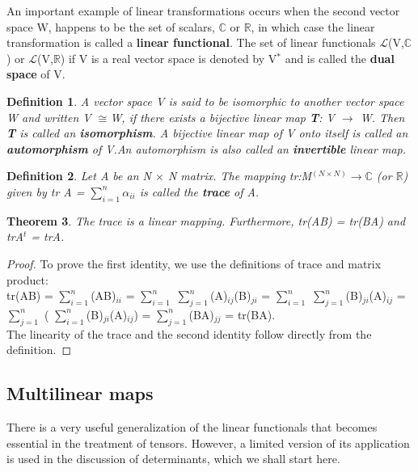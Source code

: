\documentclass[12pt,a4paper]{article}
\newtheorem{thm}{Theorem}
\newtheorem{defn}[thm]{Definition}
\begin{document}
An important example of linear transformations occurs when the second vector space W, happens to be the set of scalars, $\mathbb{C}$ or $\mathbb{R}$, in which case the linear transformation is called a \textbf{linear functional}. The set of linear functionals $\mathcal{L}$(V,$\mathbb{C}$) or $\mathcal{L}$(V,$\mathbb{R}$) if V is a real vector space is denoted by V$^*$ and is called the \textbf{dual space} of V.
\begin{defn}
A vector space V is said to be isomorphic to another vector space W and written V ${\cong}$W, if there exists a bijective linear map \textbf{T}:
V $\to$ W. Then \textbf{T} is called an \textbf{isomorphism}. A bijective linear map of V onto itself is called an \textbf{automorphism} of V.An automorphism is also called an \textbf{invertible} linear map. 
\end{defn}
\begin{defn}
Let A be an N $\times$ N matrix. The mapping tr:M$^{(N\times N)}$$\to$$\mathbb{C}$ (or $\mathbb{R}$) given by tr A = $\sum_{i=1}^{n}$$ \alpha_{ii} $ is called the \textbf{trace} of A.
\end{defn}
\begin{thm}
The trace is a linear mapping. Furthermore, tr(AB) = tr(BA) and trA$^t$ = trA.
\end{thm}
\begin{proof}
To prove the first identity, we use the definitions of trace and matrix product:\\
tr(AB) = $\sum_{i=1}^{n}$(AB)$_{ii} $ = $\sum_{i=1}^{n}$ $\sum_{j=1}^{n}$(A)$_{ij}$(B)$_{ji}$ =  $\sum_{i=1}^{n}$ $\sum_{j=1}^{n}$(B)$_{ji}$(A)$_{ij}$ = $\sum_{j=1}^{n}$ ( $\sum_{i=1}^{n}$(B)$_{ji}$(A)$_{ij}$) = $\sum_{j=1}^{n}$(BA)$_{jj}$ = tr(BA).\\
The linearity of the trace and the second identity follow directly from the definition.
\end{proof}

\subsection{Multilinear maps}
There is a very useful generalization of the linear functionals that becomes essential in the treatment of tensors. However, a limited version of its application is used in the discussion of determinants, which we shall start here.
\end{document}
